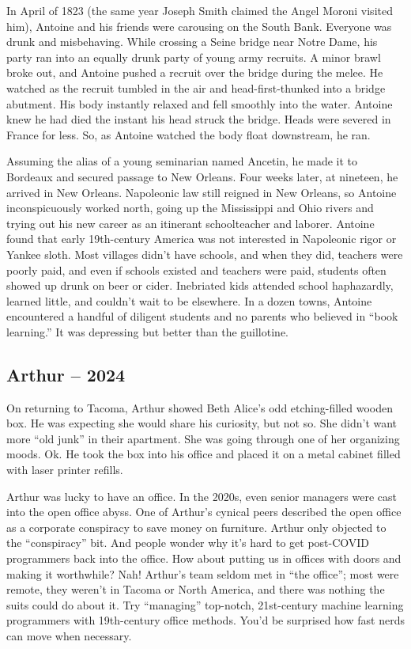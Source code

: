 In April of 1823 (the same year Joseph Smith claimed the Angel Moroni
visited him), Antoine and his friends were carousing on the South Bank.
Everyone was drunk and misbehaving. While crossing a Seine bridge near
Notre Dame, his party ran into an equally drunk party of young army
recruits. A minor brawl broke out, and Antoine pushed a recruit over the
bridge during the melee. He watched as the recruit tumbled in the air
and head-first-thunked into a bridge abutment. His body instantly
relaxed and fell smoothly into the water. Antoine knew he had died the
instant his head struck the bridge. Heads were severed in France for
less. So, as Antoine watched the body float downstream, he ran.

Assuming the alias of a young seminarian named Ancetin, he made it to
Bordeaux and secured passage to New Orleans. Four weeks later, at
nineteen, he arrived in New Orleans. Napoleonic law still reigned in New
Orleans, so Antoine inconspicuously worked north, going up the
Mississippi and Ohio rivers and trying out his new career as an
itinerant schoolteacher and laborer. Antoine found that early
19th-century America was not interested in Napoleonic rigor or Yankee
sloth. Most villages didn't have schools, and when they did, teachers
were poorly paid, and even if schools existed and teachers were paid,
students often showed up drunk on beer or cider. Inebriated kids
attended school haphazardly, learned little, and couldn't wait to be
elsewhere. In a dozen towns, Antoine encountered a handful of diligent
students and no parents who believed in ``book learning.'' It was
depressing but better than the guillotine.

\hypertarget{arthur-2024-1}{%
\subsection*{Arthur -- 2024}\label{arthur-2024-1}}

On returning to Tacoma, Arthur showed Beth Alice's odd etching-filled
wooden box. He was expecting she would share his curiosity, but not so.
She didn't want more ``old junk'' in their apartment. She was going
through one of her organizing moods. Ok. He took the box into his office
and placed it on a metal cabinet filled with laser printer refills.

Arthur was lucky to have an office. In the 2020s, even senior managers
were cast into the open office abyss. One of Arthur's cynical peers
described the open office as a corporate conspiracy to save money on
furniture. Arthur only objected to the ``conspiracy'' bit. And people
wonder why it's hard to get post-COVID programmers back into the office.
How about putting us in offices with doors and making it worthwhile?
Nah! Arthur's team seldom met in ``the office''; most were remote, they
weren't in Tacoma or North America, and there was nothing the suits
could do about it. Try ``managing'' top-notch, 21st-century machine
learning programmers with 19th-century office methods. You'd be
surprised how fast nerds can move when necessary.

